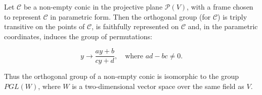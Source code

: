 Let $\mathcal{C}$ be a non-empty conic in the projective plane $\mathcal{P}(V)$, with a frame chosen to represent $\mathcal{C}$ in parametric form. Then the orthogonal group (for $\mathcal{C}$) is triply transitive on the points of $\mathcal{C}$, is faithfully represented on $\mathcal{C}$ and, in the parametric coordinates, induces the group of permutations:

$$y \rightarrow \frac{ay + b}{cy + d}, \quad \text{where } ad - bc \neq 0.$$

Thus the orthogonal group of a non-empty conic is isomorphic to the group $PGL(W)$, where $W$ is a two-dimensional vector space over the same field as $V$.
